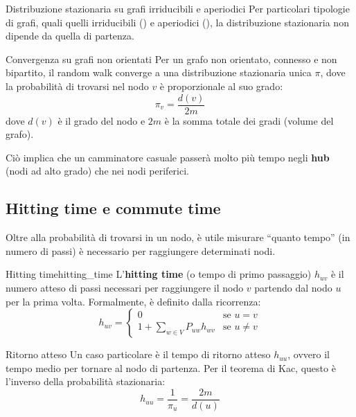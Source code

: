 \begin{nota}{Distribuzione stazionaria su grafi irriducibili e aperiodici}{}
Per particolari tipologie di grafi, quali quelli irriducibili
() e aperiodici (),
la distribuzione stazionaria non dipende da quella di partenza.
\end{nota}

\begin{teorema}{Convergenza su grafi non orientati}{}
    Per un grafo non orientato, connesso e non bipartito, il random walk converge a una distribuzione stazionaria unica $\pi$, dove la probabilità di trovarsi nel nodo $v$ è proporzionale al suo grado:
    \[
    \pi_v = \frac{d(v)}{2m}
    \]
    dove $d(v)$ è il grado del nodo e $2m$ è la somma totale dei gradi (volume del grafo).
    
    Ciò implica che un camminatore casuale passerà molto più tempo negli \textbf{hub} (nodi ad alto grado) che nei nodi periferici.
\end{teorema}

\subsection{Hitting time e commute time}

Oltre alla probabilità di trovarsi in un nodo, è utile misurare
``quanto tempo'' (in numero di passi) è necessario per raggiungere
determinati nodi.

\begin{definizione}{Hitting time}{hitting_time}
    L'\textbf{hitting time} (o tempo di primo passaggio) $h_{uv}$ è il numero
    atteso di passi necessari per raggiungere il nodo $v$ partendo dal nodo
    $u$ per la prima volta.
    Formalmente, è definito dalla ricorrenza:
    \[
    h_{uv} = 
    \begin{cases} 
        0 & \text{se } u = v \\
        1 + \sum_{w \in V} P_{uw} h_{wv} & \text{se } u \neq v 
    \end{cases}
    \]
\end{definizione}

\begin{nota}{Ritorno atteso}{}
    Un caso particolare è il tempo di ritorno atteso $h_{uu}$, ovvero il
    tempo medio per tornare al nodo di partenza.
    Per il teorema di Kac, questo è l'inverso della probabilità stazionaria:
    \[
    h_{uu} = \frac{1}{\pi_u} = \frac{2m}{d(u)}
    \]
\end{nota}

